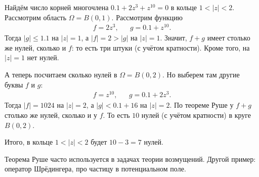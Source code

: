 \documentclass[../complex-analysis.tex]{subfiles}
\begin{document}
 \begin{exmpl}
  Найдём число корней многочлена $ 0.1+2z^{3} + z^{10} = 0 $ в кольце $ 1 < \left| z \right|  < 2 $. Рассмотрим область $ \Omega = B(0,1) $. Рассмотрим функцию
  \begin{align*}
   f = 2z^{3}, &&g = 0.1 + z^{10}.
  \end{align*} Тогда $ \left| g \right| \leqslant 1.1 $ на $ \left| z \right|=1 $, а $ \left| f \right| = 2 > \left| g \right| $ на $ \left| z \right|=1 $. Значит, $f + g$
  имеет столько же нулей, сколько и $ f $: то есть три штуки (с учётом кратности). Кроме того, на $ \left| z \right| = 1 $ нет нулей.

  А теперь посчитаем сколько нулей в $ \Omega=B(0,2) $. Но выберем там другие буквы $ f $ и $ g $:
  \begin{align*}
   f = z^{10}, && g = 0.1  + 2z^{3}.
  \end{align*} Тогда $ \left| f \right| = 1024 $ на $ \left| z \right|=2 $, а $ \left| g \right| < 0.1 + 16 $ на $ \left| z \right| = 2 $. По теореме Руше у $ f+g $ столько же нулей, сколько и у $ f $. То есть $ 10 $ нулей (с учётом кратности) в круге $ B(0, 2) $. 

  Итого, в кольце $ 1 < \left| z \right| < 2 $ будет $ 10-3 = 7 $ нулей.
 \end{exmpl}

 Теорема Руше часто используется в задачах теории возмущений. Другой пример: оператор Шрёдингера, про частицу в потенциальном поле.
\end{document}

